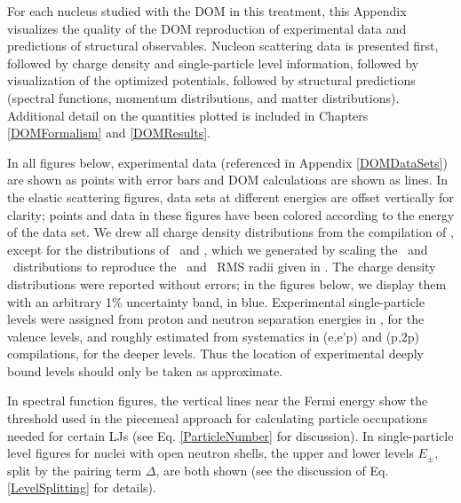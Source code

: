 For each nucleus studied with the DOM in this treatment, this Appendix
visualizes the quality of the DOM reproduction of experimental data and
predictions of structural observables. Nucleon scattering data is presented
first, followed by charge density and single-particle level information,
followed by visualization of the optimized potentials, followed by structural
predictions (spectral functions, momentum distributions, and matter
distributions). Additional detail on the quantities plotted is included in
Chapters \ref{DOMFormalism} and \ref{DOMResults}.

In all figures below, experimental data (referenced in Appendix \ref{DOMDataSets}) are shown
as points with error bars and DOM calculations are shown as lines. In
the elastic scattering figures, data sets at different energies are offset
vertically for clarity; points and data in these figures have been colored
according to the energy of the data set. We drew all charge density distributions
from the compilation of \cite{DeVries1987}, except for the distributions of
\oEight\ and \snTwelve, which we generated by scaling the \oSix\ and \snFour\
distributions to reproduce the \oEight\ and \snTwelve\ RMS radii given in
\cite{DeVries1987}. The \cite{DeVries1987} charge density distributions
were reported without
errors; in the figures below, we display them with an arbitrary 1\% uncertainty
band, in blue. Experimental
single-particle levels were assigned from proton and neutron separation energies
in \cite{AME2016}, for the valence levels,
and roughly estimated from systematics in (e,e'p) and (p,2p) compilations, for the deeper
levels. Thus the location of experimental deeply bound levels should only be
taken as approximate.

In spectral function figures, the vertical lines near the Fermi energy show the threshold 
used in the piecemeal approach for calculating particle occupations needed for certain LJs
(see Eq. \ref{ParticleNumber} for discussion). In single-particle level figures for nuclei with open
neutron shells, the upper and lower levels $E_{\pm}$, split by the pairing term $\Delta$,
are both shown (see the discussion of Eq. \ref{LevelSplitting} for details).

